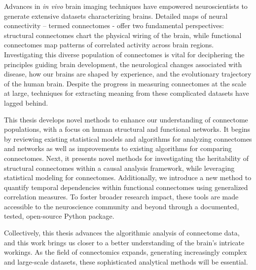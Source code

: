 
Advances in \textit{in vivo} brain imaging techniques have empowered neuroscientists to generate extensive datasets characterizing brains. Detailed maps of neural connectivity – termed connectomes - offer two fundamental perspectives: structural connectomes chart the physical wiring of the brain, while functional connectomes map patterns of correlated activity across brain regions. Investigating this diverse population of connectomes is vital for deciphering the principles guiding brain development, the neurological changes associated with disease, how our brains are shaped by experience, and the evolutionary trajectory of the human brain. Despite the progress in measuring connectomes at the scale at large, techniques for extracting meaning from these complicated datasets have lagged behind.

This thesis develops novel methods to enhance our understanding of connectome populations, with a focus on human structural and functional networks.  It begins by reviewing existing statistical models and algorithms for analyzing connectomes and networks as well as improvements to existing algorithms for comparing connectomes. Next, it presents novel methods for investigating the heritability of structural connectomes within a causal analysis framework, while leveraging statistical modeling for connectomes. Additionally, we introduce a new method to quantify temporal dependencies within functional connectomes using generalized correlation measures. To foster broader research impact, these tools are made accessible to the neuroscience community and beyond through a documented, tested, open-source Python package.

Collectively, this thesis advances the algorithmic analysis of connectome data, and this work brings us closer to a better understanding of the brain's intricate workings. As the field of connectomics expands, generating increasingly complex and large-scale datasets, these sophisticated analytical methods will be essential.



